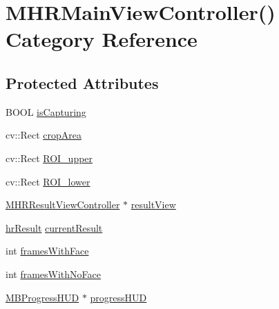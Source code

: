 \hypertarget{category_m_h_r_main_view_controller_07_08}{\section{M\+H\+R\+Main\+View\+Controller() Category Reference}
\label{category_m_h_r_main_view_controller_07_08}
}
\subsection*{Protected Attributes}
\begin{DoxyCompactItemize}
\item 
B\+O\+O\+L \hyperlink{category_m_h_r_main_view_controller_07_08_a0b32e144ea6d386ce5180a75b7f1ac76}{is\+Capturing}
\item 
cv\+::\+Rect \hyperlink{category_m_h_r_main_view_controller_07_08_a2508c2c272b97794449944d901733307}{crop\+Area}
\item 
cv\+::\+Rect \hyperlink{category_m_h_r_main_view_controller_07_08_a8ec78910220259631707236b9160c626}{R\+O\+I\+\_\+upper}
\item 
cv\+::\+Rect \hyperlink{category_m_h_r_main_view_controller_07_08_a8e5e7cd7481bac3b8bf77d684976a283}{R\+O\+I\+\_\+lower}
\item 
\hyperlink{interface_m_h_r_result_view_controller}{M\+H\+R\+Result\+View\+Controller} $\ast$ \hyperlink{category_m_h_r_main_view_controller_07_08_aee235ca60383f404b812a075eca55e75}{result\+View}
\item 
\hyperlink{struct_m_h_r_1_1hr_result}{hr\+Result} \hyperlink{category_m_h_r_main_view_controller_07_08_a8c4078159735c117ecbeb565b9c287e2}{current\+Result}
\item 
int \hyperlink{category_m_h_r_main_view_controller_07_08_a796178035a8c8f1b629b666076fe1ef3}{frames\+With\+Face}
\item 
int \hyperlink{category_m_h_r_main_view_controller_07_08_a7c19b115c59979a430b286b0ab7d57cc}{frames\+With\+No\+Face}
\item 
\hyperlink{interface_m_b_progress_h_u_d}{M\+B\+Progress\+H\+U\+D} $\ast$ \hyperlink{category_m_h_r_main_view_controller_07_08_ad7e9d3339af1110426f965b7615b5988}{progress\+H\+U\+D}
\end{DoxyCompactItemize}
